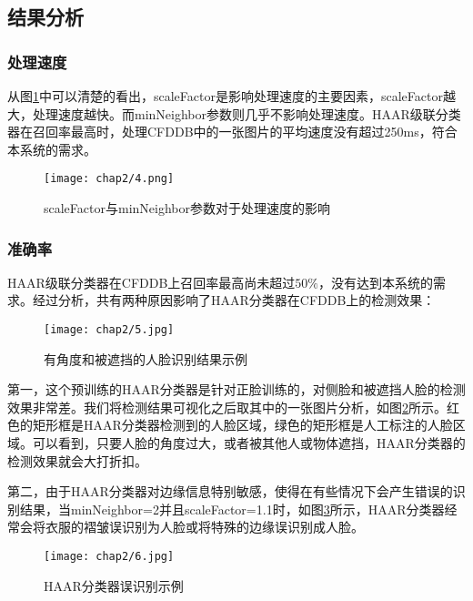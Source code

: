 \subsection{结果分析}

\subsubsection{处理速度}

从图\ref{fig:haartest:speed}中可以清楚的看出，scaleFactor是影响处理速度的主要因素，scaleFactor越大，处理速度越快。而minNeighbor参数则几乎不影响处理速度。HAAR级联分类器在召回率最高时，处理CFDDB中的一张图片的平均速度没有超过250ms，符合本系统的需求。

\begin{figure}[!htp]
	\centering
	\texttt{[image: chap2/4.png]}
	\caption{scaleFactor与minNeighbor参数对于处理速度的影响}
	\label{fig:haartest:speed}
\end{figure}

\subsubsection{准确率}

HAAR级联分类器在CFDDB上召回率最高尚未超过$50\%$，没有达到本系统的需求。经过分析，共有两种原因影响了HAAR分类器在CFDDB上的检测效果：

\begin{figure}[!htp]
	\centering
	\texttt{[image: chap2/5.jpg]}
	\caption{有角度和被遮挡的人脸识别结果示例}
	\label{fig:haartest:acc}
\end{figure}

第一，这个预训练的HAAR分类器是针对正脸训练的，对侧脸和被遮挡人脸的检测效果非常差。我们将检测结果可视化之后取其中的一张图片分析，如图\ref{fig:haartest:acc}所示。红色的矩形框是HAAR分类器检测到的人脸区域，绿色的矩形框是人工标注的人脸区域。可以看到，只要人脸的角度过大，或者被其他人或物体遮挡，HAAR分类器的检测效果就会大打折扣。

第二，由于HAAR分类器对边缘信息特别敏感，使得在有些情况下会产生错误的识别结果，当minNeighbor=2并且scaleFactor=1.1时，如图\ref{fig:haartest:acc2}所示，HAAR分类器经常会将衣服的褶皱误识别为人脸或将特殊的边缘误识别成人脸。

\begin{figure}[!htp]
	\centering
	\texttt{[image: chap2/6.jpg]}
	\caption{HAAR分类器误识别示例}
	\label{fig:haartest:acc2}
\end{figure}

